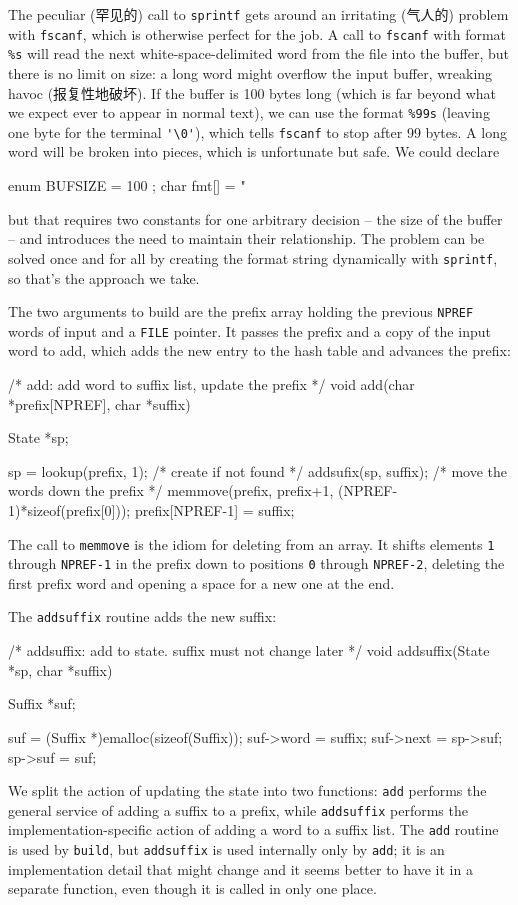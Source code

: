 The peculiar (罕见的) call to \verb'sprintf' gets around an irritating
(气人的) problem with \verb'fscanf', which is otherwise perfect for the
job. A call to \verb'fscanf' with format \verb'%s' will read the next
white-space-delimited word from the file into the buffer, but there is no
limit on size: a long word might overflow the input buffer, wreaking havoc
(报复性地破坏). If the buffer is 100 bytes long (which is far beyond what
we expect ever to appear in normal text), we can use the format \verb'%99s'
(leaving one byte for the terminal \verb"'\0'"), which tells \verb'fscanf'
to stop after 99 bytes. A long word will be broken into pieces, which is
unfortunate but safe. We could declare
\begin{badcode}
    enum { BUFSIZE = 100 };
    char    fmt[] = "%
\end{badcode}
but that requires two constants for one arbitrary decision -- the size of
the buffer -- and introduces the need to maintain their relationship. The
problem can be solved once and for all by creating the format string
dynamically with \verb'sprintf', so that's the approach we take.

The two arguments to build are the prefix array holding the previous
\verb'NPREF' words of input and a \verb'FILE' pointer. It passes the prefix
and a copy of the input word to add, which adds the new entry to the hash
table and advances the prefix:
\begin{wellcode}
    /* add: add word to suffix list, update the prefix */
    void add(char *prefix[NPREF], char *suffix)
    {
        State   *sp;

        sp = lookup(prefix, 1); /* create if not found */
        addsufix(sp, suffix);
        /* move the words down the prefix */
        memmove(prefix, prefix+1, (NPREF-1)*sizeof(prefix[0]));
        prefix[NPREF-1] = suffix;
    }
\end{wellcode}

The call to \verb'memmove' is the idiom for deleting from an array. It
shifts elements \verb'1' through \verb'NPREF-1' in the prefix down to
positions \verb'0' through \verb'NPREF-2', deleting the first prefix word
and opening a space for a new one at the end.

The \verb'addsuffix' routine adds the new suffix:
\begin{wellcode}
    /* addsuffix: add to state. suffix must not change later */
    void addsuffix(State *sp, char *suffix)
    {
        Suffix  *suf;

        suf = (Suffix *)emalloc(sizeof(Suffix));
        suf->word = suffix;
        suf->next = sp->suf;
        sp->suf = suf;
    }
\end{wellcode}
We split the action of updating the state into two functions: \verb'add'
performs the general service of adding a suffix to a prefix, while
\verb'addsuffix' performs the implementation-specific action of adding a
word to a suffix list. The \verb'add' routine is used by \verb'build', but
\verb'addsuffix' is used internally only by \verb'add'; it is an
implementation detail that might change and it seems better to have it in a
separate function, even though it is called in only one place.

